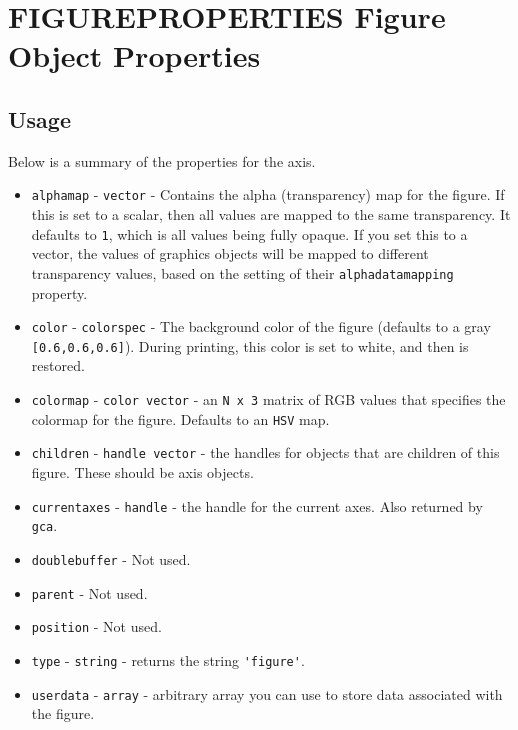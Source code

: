 \section{FIGUREPROPERTIES Figure Object Properties}

\subsection{Usage}

Below is a summary of the properties for the axis.
\begin{itemize}
\item  \verb|alphamap| - \verb|vector| - Contains the alpha (transparency) map for the
 figure.  If this is set to a scalar, then all values are mapped to the same 
 transparency.  It defaults to \verb|1|, which is all values being fully opaque.  
 If you set this to a vector, the values of graphics objects will be mapped to 
 different transparency values, based on the setting of their \verb|alphadatamapping|
 property.

\item  \verb|color| - \verb|colorspec| - The background color of the figure (defaults to a
 gray \verb|[0.6,0.6,0.6]|).  During printing, this color is set to white, and then
 is restored.

\item  \verb|colormap| - \verb|color vector| - an \verb|N x 3| matrix of RGB values that
 specifies the colormap for the figure.  Defaults to an \verb|HSV| map.  

\item  \verb|children| - \verb|handle vector| - the handles for objects that are children
 of this figure.  These should be axis objects.

\item  \verb|currentaxes| - \verb|handle| - the handle for the current axes.  Also returned
 by \verb|gca|.

\item  \verb|doublebuffer| - Not used.

\item  \verb|parent| -  Not used.

\item  \verb|position| - Not used.

\item  \verb|type| - \verb|string| - returns the string \verb|'figure'|.

\item  \verb|userdata| - \verb|array| - arbitrary array you can use to store data associated
 with the figure.


\end{itemize}
